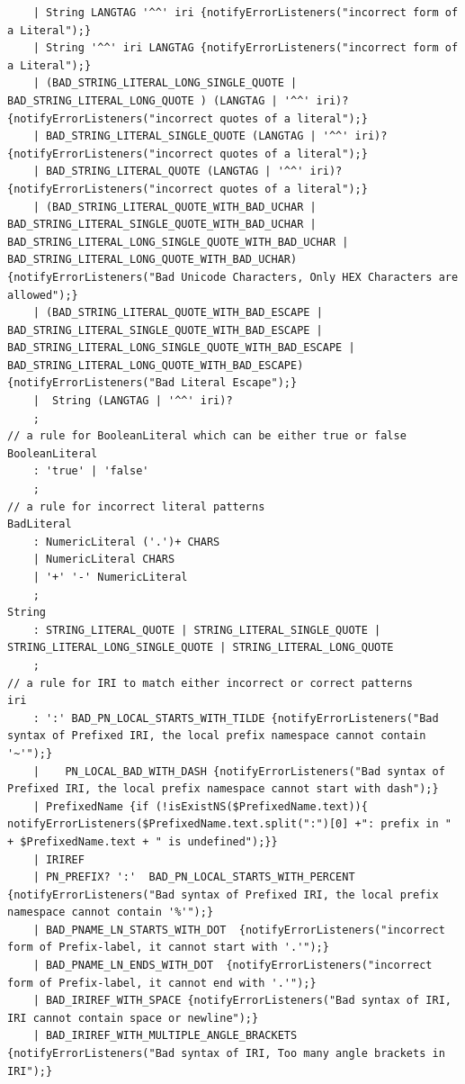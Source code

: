 \begin{appendices}
\begin{lstlisting}
    | String LANGTAG '^^' iri {notifyErrorListeners("incorrect form of a Literal");}
    | String '^^' iri LANGTAG {notifyErrorListeners("incorrect form of a Literal");}  
    | (BAD_STRING_LITERAL_LONG_SINGLE_QUOTE | BAD_STRING_LITERAL_LONG_QUOTE ) (LANGTAG | '^^' iri)?  {notifyErrorListeners("incorrect quotes of a literal");}
    | BAD_STRING_LITERAL_SINGLE_QUOTE (LANGTAG | '^^' iri)? {notifyErrorListeners("incorrect quotes of a literal");}
    | BAD_STRING_LITERAL_QUOTE (LANGTAG | '^^' iri)? {notifyErrorListeners("incorrect quotes of a literal");}
    | (BAD_STRING_LITERAL_QUOTE_WITH_BAD_UCHAR | BAD_STRING_LITERAL_SINGLE_QUOTE_WITH_BAD_UCHAR | BAD_STRING_LITERAL_LONG_SINGLE_QUOTE_WITH_BAD_UCHAR | BAD_STRING_LITERAL_LONG_QUOTE_WITH_BAD_UCHAR) {notifyErrorListeners("Bad Unicode Characters, Only HEX Characters are allowed");}
    | (BAD_STRING_LITERAL_QUOTE_WITH_BAD_ESCAPE | BAD_STRING_LITERAL_SINGLE_QUOTE_WITH_BAD_ESCAPE | BAD_STRING_LITERAL_LONG_SINGLE_QUOTE_WITH_BAD_ESCAPE | BAD_STRING_LITERAL_LONG_QUOTE_WITH_BAD_ESCAPE) {notifyErrorListeners("Bad Literal Escape");}
    |  String (LANGTAG | '^^' iri)?
    ;
// a rule for BooleanLiteral which can be either true or false
BooleanLiteral
    : 'true' | 'false'
    ;
// a rule for incorrect literal patterns
BadLiteral 
    : NumericLiteral ('.')+ CHARS 
    | NumericLiteral CHARS 
    | '+' '-' NumericLiteral
    ;
String
    : STRING_LITERAL_QUOTE | STRING_LITERAL_SINGLE_QUOTE | STRING_LITERAL_LONG_SINGLE_QUOTE | STRING_LITERAL_LONG_QUOTE
    ;
// a rule for IRI to match either incorrect or correct patterns
iri
    : ':' BAD_PN_LOCAL_STARTS_WITH_TILDE {notifyErrorListeners("Bad syntax of Prefixed IRI, the local prefix namespace cannot contain '~'");}
    |    PN_LOCAL_BAD_WITH_DASH {notifyErrorListeners("Bad syntax of Prefixed IRI, the local prefix namespace cannot start with dash");}
    | PrefixedName {if (!isExistNS($PrefixedName.text)){ notifyErrorListeners($PrefixedName.text.split(":")[0] +": prefix in " + $PrefixedName.text + " is undefined");}}
    | IRIREF 
    | PN_PREFIX? ':'  BAD_PN_LOCAL_STARTS_WITH_PERCENT {notifyErrorListeners("Bad syntax of Prefixed IRI, the local prefix namespace cannot contain '%'");}
    | BAD_PNAME_LN_STARTS_WITH_DOT  {notifyErrorListeners("incorrect form of Prefix-label, it cannot start with '.'");} 
    | BAD_PNAME_LN_ENDS_WITH_DOT  {notifyErrorListeners("incorrect form of Prefix-label, it cannot end with '.'");} 
    | BAD_IRIREF_WITH_SPACE {notifyErrorListeners("Bad syntax of IRI, IRI cannot contain space or newline");}
    | BAD_IRIREF_WITH_MULTIPLE_ANGLE_BRACKETS {notifyErrorListeners("Bad syntax of IRI, Too many angle brackets in IRI");}

\end{lstlisting}
\end{appendices}
